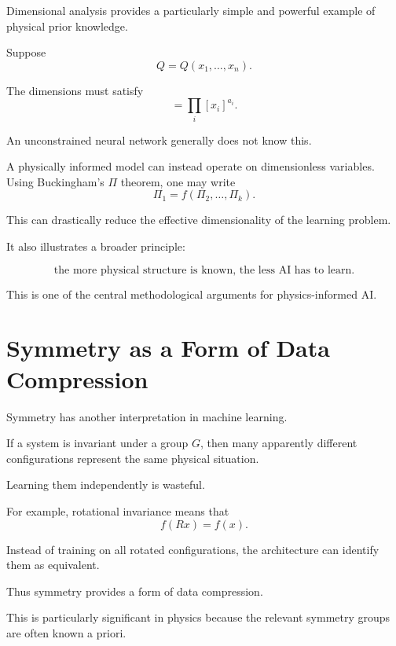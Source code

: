 \documentclass[11pt,a4paper]{article}
\begin{document}
Dimensional analysis provides a particularly simple and powerful example of
physical prior knowledge.

Suppose
\begin{equation}
Q=Q(x_1,\ldots,x_n).
\end{equation}

The dimensions must satisfy
\begin{equation}
[Q]=
\prod_i[x_i]^{a_i}.
\end{equation}

An unconstrained neural network generally does not know this.

A physically informed model can instead operate on dimensionless variables.
Using Buckingham's $\Pi$ theorem, one may write
\begin{equation}
\Pi_1=f(\Pi_2,\ldots,\Pi_k).
\end{equation}

This can drastically reduce the effective dimensionality of the learning
problem.

It also illustrates a broader principle:

\begin{equation}
\boxed{
\text{the more physical structure is known, the less AI has to learn}.
}
\end{equation}

This is one of the central methodological arguments for physics-informed AI.

\section{Symmetry as a Form of Data Compression}

Symmetry has another interpretation in machine learning.

If a system is invariant under a group $G$, then many apparently different
configurations represent the same physical situation.

Learning them independently is wasteful.

For example, rotational invariance means that
\begin{equation}
f(Rx)=f(x).
\end{equation}

Instead of training on all rotated configurations, the architecture can identify
them as equivalent.

Thus symmetry provides a form of data compression.

This is particularly significant in physics because the relevant symmetry groups
are often known a priori.
\end{document}

